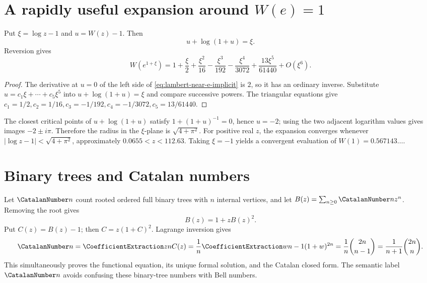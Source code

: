 \documentclass[11pt,a4paper,oneside,openany]{book}
\theoremstyle{definition}
\theoremstyle{remark}
\begin{document}
\section{A rapidly useful expansion around \texorpdfstring{$W(e)=1$}{W(e)=1}}
Put $\xi=\log z-1$ and $u=W(z)-1$.  Then
\begin{equation}\label{eq:lambert-near-e-implicit}
 u+\log(1+u)=\xi.
\end{equation}
Reversion gives
\begin{equation}\label{eq:lambert-near-e}
 W(e^{1+\xi})=1+\frac{\xi}{2}+\frac{\xi^2}{16}
 -\frac{\xi^3}{192}-\frac{\xi^4}{3072}
 +\frac{13\xi^5}{61440}+O(\xi^6).
\end{equation}
\begin{proof}
The derivative at $u=0$ of the left side of
\eqref{eq:lambert-near-e-implicit} is $2$, so it has an ordinary inverse.
Substitute $u=c_1\xi+\cdots+c_5\xi^5$ into
$u+\log(1+u)=\xi$ and compare successive powers.  The triangular equations give
$c_1=1/2,c_2=1/16,c_3=-1/192,c_4=-1/3072,c_5=13/61440$.
\end{proof}
The closest critical points of $u+\log(1+u)$ satisfy
$1+(1+u)^{-1}=0$, hence $u=-2$; using the two adjacent logarithm values gives
images $-2\pm i\pi$.  Therefore the radius in the $\xi$-plane is
$\sqrt{4+\pi^2}$.  For positive real $z$, the expansion converges whenever
$|\log z-1|<\sqrt{4+\pi^2}$, approximately
$0.0655<z<112.63$.  Taking $\xi=-1$ yields a convergent evaluation of
$W(1)=0.567143\ldots$.

\section{Binary trees and Catalan numbers}
Let $\CatalanNumber n$ count rooted ordered full binary trees with $n$ internal vertices, and
let $B(z)=\sum_{n\ge0}\CatalanNumber n z^n$.  Removing the root gives
\begin{equation}\label{eq:binary-tree-functional}
 B(z)=1+zB(z)^2.
\end{equation}
Put $C(z)=B(z)-1$; then $C=z(1+C)^2$.  Lagrange inversion gives
\begin{equation}\label{eq:catalan-lagrange}
 \CatalanNumber n=\CoefficientExtraction znC(z)=\frac1n\CoefficientExtraction w{n-1}(1+w)^{2n}
 =\frac1n\binom{2n}{n-1}=\frac1{n+1}\binom{2n}{n}.
\end{equation}
This simultaneously proves the functional equation, its unique formal solution,
and the Catalan closed form.  The semantic label $\CatalanNumber n$ avoids confusing
these binary-tree numbers with Bell numbers.
\end{document}
